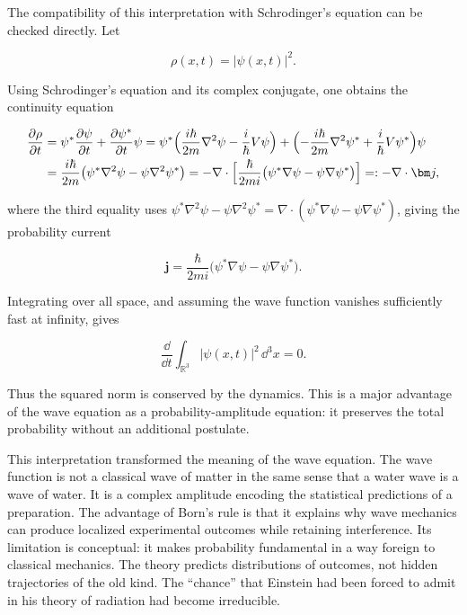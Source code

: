 The compatibility of this interpretation with Schrodinger's equation can be checked directly. Let
\begin{linenomath}
    \begin{equation}
        \rho(x,t)=|\psi(x,t)|^2.
    \end{equation}
\end{linenomath}
Using Schrodinger's equation and its complex conjugate, one obtains the continuity equation
\begin{linenomath}
    \begin{align}
        \frac{\partial\rho}{\partial t}
        &= \psi^{*}\frac{\partial\psi}{\partial t} + \frac{\partial\psi^{*}}{\partial t}\psi
         = \psi^{*}\Bigl(\frac{i\hbar}{2m}\nabla^{2}\psi - \frac{i}{\hbar}V\psi\Bigr)
           + \Bigl(-\frac{i\hbar}{2m}\nabla^{2}\psi^{*} + \frac{i}{\hbar}V\psi^{*}\Bigr)\psi
           \nonumber\\
        &= \frac{i\hbar}{2m}\bigl(\psi^{*}\nabla^{2}\psi - \psi\nabla^{2}\psi^{*}\bigr)
         = -\nabla\cdot\Bigl[\frac{\hbar}{2mi}\bigl(\psi^{*}\nabla\psi - \psi\nabla\psi^{*}\bigr)\Bigr]
         =: -\nabla\cdot\bm j,
    \end{align}
\end{linenomath}
where the third equality uses $\psi^{*}\nabla^{2}\psi-\psi\nabla^{2}\psi^{*}
=\nabla\cdot(\psi^{*}\nabla\psi-\psi\nabla\psi^{*})$,
giving the probability current
\begin{linenomath}
    \begin{equation}
        \bm j = \frac{\hbar}{2mi}\bigl(\psi^{*}\nabla\psi - \psi\nabla\psi^{*}\bigr).
    \end{equation}
\end{linenomath}
Integrating over all space, and assuming the wave function vanishes sufficiently fast at infinity, gives
\begin{linenomath}
    \begin{equation}
        \frac{\dd}{\dd t}\int_{\mathbb{R}^3}|\psi(x,t)|^2\,\dd^3x=0.
    \end{equation}
\end{linenomath}
Thus the squared norm is conserved by the dynamics. This is a major advantage of the wave equation as a probability-amplitude equation: it preserves the total probability without an additional postulate.

This interpretation transformed the meaning of the wave equation. The wave function is not a classical wave of matter in the same sense that a water wave is a wave of water. It is a complex amplitude encoding the statistical predictions of a preparation. The advantage of Born's rule is that it explains why wave mechanics can produce localized experimental outcomes while retaining interference. Its limitation is conceptual: it makes probability fundamental in a way foreign to classical mechanics. The theory predicts distributions of outcomes, not hidden trajectories of the old kind. The ``chance'' that Einstein had been forced to admit in his theory of radiation had become irreducible.

